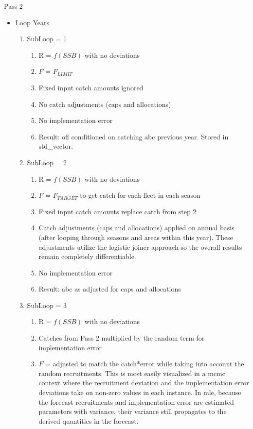 Pass 2
\begin{itemize}
	\item Loop Years
	\begin{enumerate}
		\item SubLoop = 1
		\begin{enumerate}
			\item R = $f(SSB)$ with no deviations
			\item $F$ = $F_{LIMIT}$
			\item Fixed input catch amounts ignored
			\item No catch adjustments (caps and allocations)
			\item No implementation error
			\item Result: \gls{ofl} conditioned on catching \gls{abc} previous year. Stored in std\_vector.
		\end{enumerate}
		\item SubLoop = 2
		\begin{enumerate}
			\item R = $f(SSB)$ with no deviations
			\item $F$ = $F_{TARGET}$ to get catch for each fleet in each season
			\item Fixed input catch amounts replace catch from step 2
			\item Catch adjustments (caps and allocations) applied on annual basis (after looping through seasons and areas within this year). These adjustments utilize the logistic joiner approach so the overall results remain completely differentiable.
			\item No implementation error
			\item Result: \gls{abc} as adjusted for caps and allocations
		\end{enumerate}
		\item SubLoop = 3
		\begin{enumerate}
			\item R = $f(SSB)$ with no deviations
			\item Catches from Pass 2 multiplied by the random term for implementation error
			\item $F$ = adjusted to match the catch*error while taking into account the random recruitments. This is most easily visualized in a \gls{mcmc} context where the recruitment deviation and the implementation error deviations take on non-zero values in each instance. In \gls{mle}, because the forecast recruitments and implementation error are estimated parameters with variance, their variance still propagates to the derived quantities in the forecast.

\end{enumerate}
\end{enumerate}
\end{itemize}
